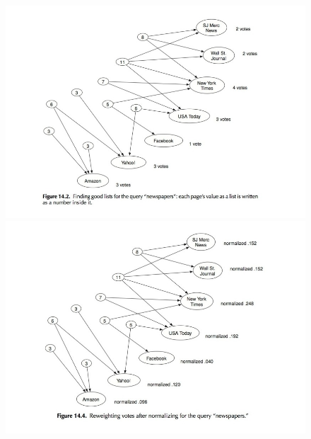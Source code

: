 \begin{figure}
\centering
\includegraphics[scale=0.5]{images/ref/fig-14-2.jpeg}
\includegraphics[scale=0.5]{images/ref/fig-14-4.jpeg}

\caption{}
\end{figure}


